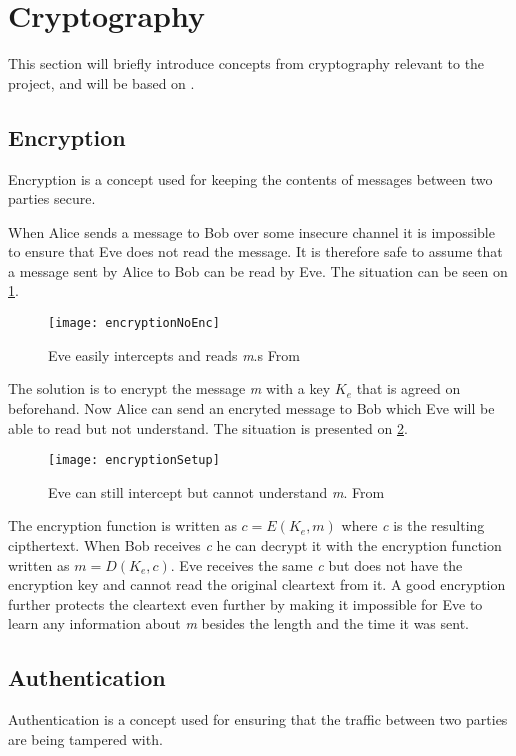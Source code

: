 \section{Cryptography}\label{cryptography}
This section will briefly introduce concepts from cryptography relevant to the project, and will be based on \cite{cryptoenginering}.

\subsection{Encryption}
Encryption is a concept used for keeping the contents of messages between two parties secure.

When Alice sends a message to Bob over some insecure channel it is impossible to ensure that Eve does not read the message.
It is therefore safe to assume that a message sent by Alice to Bob can be read by Eve.
The situation can be seen on \cref{crypto:noenc}.

\begin{figure}[H]
	\centering
	\texttt{[image: encryptionNoEnc]}
	\caption{Eve easily intercepts and reads \emph{m}.s From \citet[p.~50]{cryptoenginering}}
	\label{crypto:noenc}
\end{figure}

The solution is to encrypt the message \emph{m} with a key $K_e$ that is agreed on beforehand.
Now Alice can send an encryted message to Bob which Eve will be able to read but not understand.
The situation is presented on \cref{crypto:enc}.

\begin{figure}[H]
	\centering
	\texttt{[image: encryptionSetup]}
	\caption{Eve can still intercept but cannot understand \emph{m}. From \citet[p.~50]{cryptoenginering}}
	\label{crypto:enc}
\end{figure}

The encryption function is written as $c = E(K_e,m)$ where \emph{c} is the resulting cipthertext.
When Bob receives \emph{c} he can decrypt it with the encryption function written as $m = D(K_e,c)$.
Eve receives the same \emph{c} but does not have the encryption key and cannot read the original cleartext from it.
A good encryption further protects the cleartext even further by making it impossible for Eve to learn any information about \emph{m} besides the length and the time it was sent.


\subsection{Authentication}
Authentication is a concept used for ensuring that the traffic between two parties are being tampered with.


